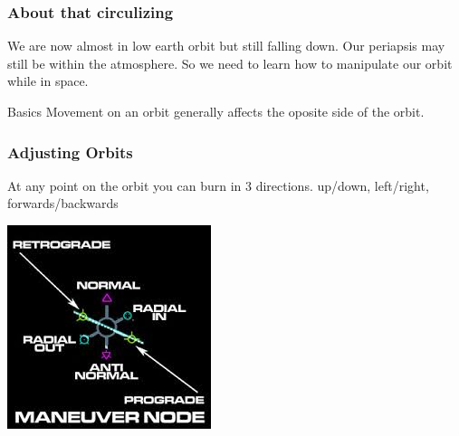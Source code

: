 {
%
\begin{frame}
\end{frame}
\begin{frame}
    \frametitle{About that circulizing}
    \begin{block}{}
        We are now almost in low earth orbit but still falling down. Our periapsis may still be within the atmosphere.
        So we need to learn how to manipulate our orbit while in space.
    \end{block}
    \begin{block}{Basics}
        Movement on an orbit generally affects the oposite side of the orbit.
    \end{block}
\end{frame}
\begin{frame}
    \frametitle{Adjusting Orbits}
    \begin{block}{}
        \begin{center}
            At any point on the orbit you can burn in 3 directions. up/down, left/right, forwards/backwards
        \end{center}
    \end{block}
    \begin{block}{}
        \begin{center}
            \includegraphics[scale=0.8]{images/maneuver_node.jpg}

\end{center}
\end{block}
\end{frame}}
